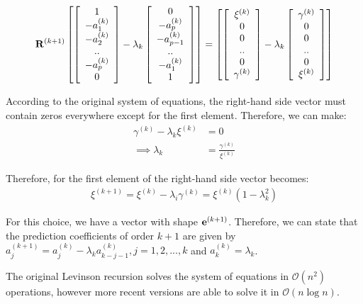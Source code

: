 \documentclass[../main.tex]{subfiles}
\begin{document}
\begin{align*}
\mathbf{R}^{(k+1)}\left[ \left[ \begin{array}{c} 1\\ -a_1^{(k)} \\ -a_2^{(k)} \\ .. \\ -a_p^{(k)} \\ 0 \end{array} \right] - \lambda_k\left[ \begin{array}{c} 0 \\ -a_p^{(k)} \\ -a_{p-1}^{(k)} \\ .. \\ -a_1^{(k)} \\ 1 \\ \end{array} \right] \right] = \left[ \left[ \begin{array}{c} \xi^{(k)} \\ 0 \\ 0 \\ .. \\ 0 \\ \gamma^{(k)} \end{array} \right] - \lambda_k\left[ \begin{array}{c} \gamma^{(k)} \\ 0 \\ 0 \\ .. \\ 0 \\ \xi^{(k)} \\ \end{array} \right] \right]
\end{align*}
\par According to the original system of equations, the right-hand side vector must contain zeros everywhere except for the first element. Therefore, we can make:
\begin{align*}
\gamma^{(k)} - \lambda_k\xi^{(k)} &= 0\\
\implies \lambda_k &= \frac{\gamma^{(k)}}{\xi^{(k)}}
\end{align*}
\par Therefore, for the first element of the right-hand side vector becomes:
\begin{align*}
\xi^{(k+1)} = \xi^{(k)} - \lambda_i\gamma^{(k)} = \xi^{(k)}(1-\lambda_k^2)
\end{align*}
\par For this choice, we have a vector with shape $\mathbf{e}^{(k+1)}$. Therefore, we can state that the prediction coefficients of order $k+1$ are given by $a_j^{(k+1)} = a_j^{(k)}-\lambda_ka_{k-j-1}^{(k)}, j = 1,2,...,k$ and  $a_k^{(k)} = \lambda_k$. 
\par The original Levinson recursion solves the system of equations in $\mathcal{O}(n^2)$ operations, however more recent versions are able to solve it in $\mathcal{O}(n\log{n})$.
\end{document}
